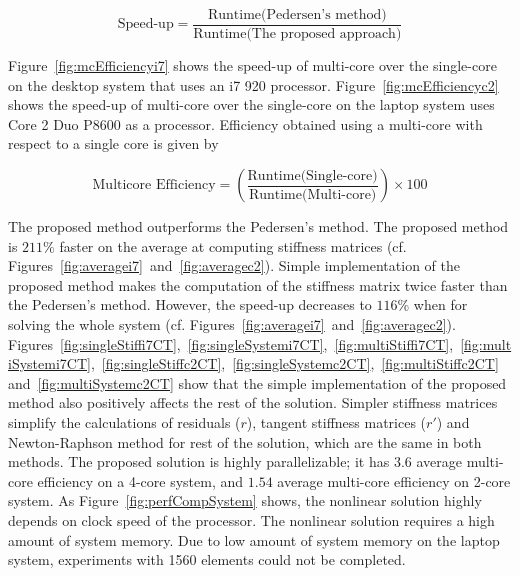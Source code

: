 \begin{equation}
\text{Speed-up} = \frac{\text{Runtime(Pedersen's method)}}{\text{Runtime(The proposed approach)}}
\label{eqn:5.2}
\end{equation}

Figure~\ref{fig:mcEfficiencyi7} shows the speed-up of multi-core over the single-core on the desktop system that uses an i7 920 processor.
Figure~\ref{fig:mcEfficiencyc2} shows the speed-up of multi-core over the single-core on the laptop system uses Core 2 Duo P8600 as a processor.
Efficiency obtained using a multi-core with respect to a single core is given by

\begin{equation}
\text{Multicore Efficiency} = \left(\frac{\text{Runtime(Single-core)}}{\text{Runtime(Multi-core)}}\right) \times 100
\label{eqn:5.3}
\end{equation}

The proposed method outperforms the Pedersen's method. The proposed method is $211\%$ faster on the average at computing stiffness matrices (cf. Figures~\ref{fig:averagei7}~and~\ref{fig:averagec2}). Simple implementation of the proposed method makes the computation of the stiffness matrix twice faster than the Pedersen's method. However, the speed-up decreases to $116\%$ when for solving the whole system (cf. Figures~\ref{fig:averagei7}~and~\ref{fig:averagec2}). Figures~\ref{fig:singleStiffi7CT},~\ref{fig:singleSystemi7CT},~\ref{fig:multiStiffi7CT},~\ref{fig:multiSystemi7CT},~\ref{fig:singleStiffc2CT},~\ref{fig:singleSystemc2CT},~\ref{fig:multiStiffc2CT}~and~\ref{fig:multiSystemc2CT} show that the simple implementation of the proposed method also positively affects the rest of the solution. Simpler stiffness matrices simplify the calculations of residuals ($r$), tangent stiffness matrices ($r'$) and Newton-Raphson method for rest of the solution, which are the same in both methods. The proposed solution is highly parallelizable; it has $3.6$ average multi-core efficiency on a 4-core system, and $1.54$ average multi-core efficiency on 2-core system. As Figure~\ref{fig:perfCompSystem} shows, the nonlinear solution highly depends on clock speed of the processor. The nonlinear solution requires a high amount of system memory. Due to low amount of system memory on the laptop system, experiments with 1560 elements could not be completed.


